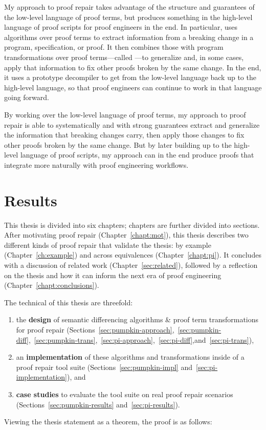 My approach to proof repair takes advantage of the structure and guarantees of the low-level language of proof terms,
but produces something in the high-level language of proof scripts for proof engineers in the end.
In particular, uses  algorithms over proof terms
to extract information from a breaking change in a program, specification, or proof.
It then combines those with program transformations over proof terms---called ---to
generalize and, in some cases, apply that information to fix other  proofs broken by the same change.
In the end, it uses a prototype decompiler to get from the low-level language back up to the high-level language,
so that proof engineers can continue to work in that language going forward. %

By working over the low-level language of proof terms,
my approach to proof repair is able to systematically and with strong guarantees extract and generalize the information that breaking changes carry,
then apply those changes to fix other proofs broken by the same change.
But by later building up to the high-level language of proof scripts,
my approach can in the end produce proofs that integrate more naturally with proof engineering workflows.

\section{Results}
\label{sec:intro-results}

This thesis is divided into six chapters; chapters are further divided into sections.
After motivating proof repair (Chapter~\ref{chapt:mot}),
this thesis describes two different kinds of proof repair that validate the thesis:
by example (Chapter~\ref{ch:example}) and across equivalences (Chapter~\ref{chapt:pi}).
It concludes with a discussion of related work (Chapter~\ref{sec:related}),
followed by a reflection on the thesis and how it can inform the next era of 
proof engineering (Chapter~\ref{chapt:conclusions}).

The technical  of this thesis are threefold:

\begin{enumerate}
\item the \textbf{design} of semantic differencing algorithms \& proof term transformations for proof repair (Sections~\ref{sec:pumpkin-approach},~\ref{sec:pumpkin-diff},~\ref{sec:pumpkin-trans},~\ref{sec:pi-approach},~\ref{sec:pi-diff},and~\ref{sec:pi-trans}),
\item an \textbf{implementation} of these algorithms and transformations inside of a proof repair tool suite (Sections~\ref{sec:pumpkin-impl} and~\ref{sec:pi-implementation}), and
\item \textbf{case studies} to evaluate the tool suite on real proof repair scenarios (Sections~\ref{sec:pumpkin-results} and~\ref{sec:pi-results}).
\end{enumerate}
Viewing the thesis statement as a theorem, the proof is as follows: %


